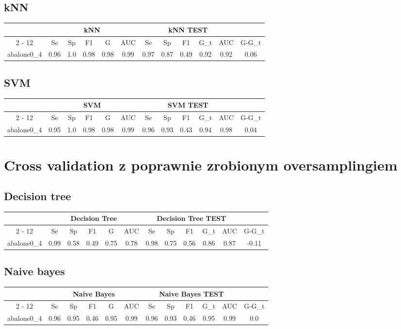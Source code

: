 \documentclass{article}%
\begin{document}
%
\subsection*{kNN}%
\begin{tabular}{|c|c|c|c|c|c|c|c|c|c|c|c|}%
\hline%
&\multicolumn{5}{|c|}{kNN}&\multicolumn{5}{|c|}{kNN TEST}&\\%
\cline{2%
-%
12}%
&Se&Sp&F1&G&AUC&Se&Sp&F1&G\_t&AUC&G{-}G\_t\\%
\hline%
abalone0\_4&0.96&1.0&0.98&0.98&0.99&0.97&0.87&0.49&0.92&0.92&0.06\\%
\hline%
\end{tabular}

%
\subsection*{SVM}%
\begin{tabular}{|c|c|c|c|c|c|c|c|c|c|c|c|}%
\hline%
&\multicolumn{5}{|c|}{SVM}&\multicolumn{5}{|c|}{SVM TEST}&\\%
\cline{2%
-%
12}%
&Se&Sp&F1&G&AUC&Se&Sp&F1&G\_t&AUC&G{-}G\_t\\%
\hline%
abalone0\_4&0.95&1.0&0.98&0.98&0.99&0.96&0.93&0.43&0.94&0.98&0.04\\%
\hline%
\end{tabular}

%
\section*{Cross validation z poprawnie zrobionym oversamplingiem}%
\subsection*{Decision tree}%
\begin{tabular}{|c|c|c|c|c|c|c|c|c|c|c|c|}%
\hline%
&\multicolumn{5}{|c|}{Decision Tree}&\multicolumn{5}{|c|}{Decision Tree TEST}&\\%
\cline{2%
-%
12}%
&Se&Sp&F1&G&AUC&Se&Sp&F1&G\_t&AUC&G{-}G\_t\\%
\hline%
abalone0\_4&0.99&0.58&0.49&0.75&0.78&0.98&0.75&0.56&0.86&0.87&{-}0.11\\%
\hline%
\end{tabular}

%
\subsection*{Naive bayes}%
\begin{tabular}{|c|c|c|c|c|c|c|c|c|c|c|c|}%
\hline%
&\multicolumn{5}{|c|}{Naive Bayes}&\multicolumn{5}{|c|}{Naive Bayes TEST}&\\%
\cline{2%
-%
12}%
&Se&Sp&F1&G&AUC&Se&Sp&F1&G\_t&AUC&G{-}G\_t\\%
\hline%
abalone0\_4&0.96&0.95&0.46&0.95&0.99&0.96&0.93&0.46&0.95&0.99&0.0\\%
\hline%
\end{tabular}
\end{document}
